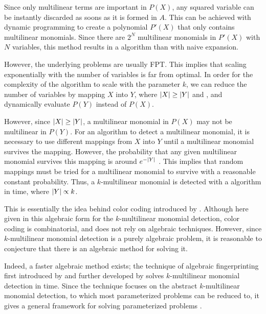 Since only multilinear terms are important in $P(X)$, 
any squared variable can be instantly discarded as soons as it is formed in $A$. 
This can be achieved with dynamic programming to create a polynomial $P'(X)$ that 
only contains multilinear monomials. Since there are $2^N$ multilinear monomials in $P'(X)$ with 
$N$ variables, this method results in a
 algorithm than with naive expansion.

However, the underlying problems are usually FPT. This implies that scaling exponentially 
with the number of variables is far from optimal. In order for the complexity of the algorithm to scale 
with the parameter $k$, we can reduce the number of variables by mapping $X$ into $Y$, where 
${\left\vert X\right\vert} \geq {\left\vert Y\right\vert}$ and
, and dynamically evaluate $P(Y)$ instead of
$P(X)$. 

However, since ${\left\vert X\right\vert} \geq {\left\vert Y\right\vert}$, a multilinear monomial in $P(X)$ may not be multilinear in $P(Y)$. 
For an algorithm to detect a multilinear monomial, it is necessary to use different mappings 
from $X$ into $Y$ until a multilinear monomial survives the mapping. However, the probability 
that any given multilinear monomial survives this mapping is around $e^{-{\left\vert Y\right\vert}}$ \cite{KouWil15}.
This implies that  random mappings must be tried for a
multilinear monomial to survive with a reasonable constant probability. Thus, a
$k$-multilinear monomial is detected with a 
 algorithm in  time, where ${\left\vert Y\right\vert} \propto k$.

This is essentially the idea behind color coding introduced by \citeauthor{Alon95} \cite{Alon95}. 
Although here given in this algebraic form for the $k$-multilinear monomial detection, 
color coding is combinatorial, and does not rely on algebraic techniques. 
However, since $k$-multilinear monomial detection is a purely algebraic problem, it is reasonable to 
conjecture that there is an algebraic method for solving it.

Indeed, a faster algebraic method exists; the technique of algebraic fingerprinting 
first introduced by \citeauthor{Koutis08} \cite{Koutis08} and 
further developed by \citeauthor{Williams09} \cite{Williams09} 
solves $k$-multilinear monomial detection in  time. 
Since the technique focuses on the abstract $k$-multilinear monomial detection, to which 
most parameterized problems can be reduced to, it gives a general framework for 
solving parameterized problems \cite{KouWil15}.

